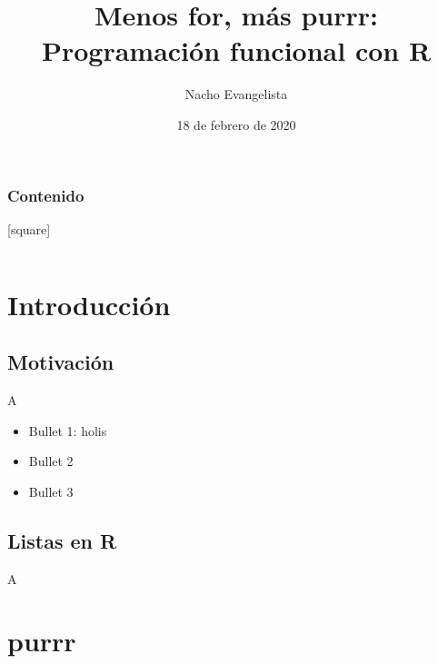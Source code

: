 \documentclass[ignorenonframetext,]{beamer}
\title{\textbf{Menos for, más purrr}:\\
Programación funcional con R}
\author{Nacho Evangelista}
\date{18 de febrero de 2020}
\providecommand{\tightlist}{%
	\setlength{\itemsep}{0pt}\setlength{\parskip}{0pt}}
\begin{document}
		\frame{\titlepage}
		
		\begin{frame}
\frametitle{Contenido} %
[square]
\begin{columns}[t]
		\tableofcontents[sections={1-3}]
		\tableofcontents[sections={4-8}]
\end{columns}
\end{frame}

\hypertarget{introducciuxf3n}{%
\section{Introducción}\label{introducciuxf3n}}

\hypertarget{motivaciuxf3n}{%
\subsection{Motivación}\label{motivaciuxf3n}}

\begin{frame}{A}
\protect\hypertarget{a}{}
\begin{itemize}
\tightlist
\item
  Bullet 1: holis
\item
  Bullet 2
\item
  Bullet 3
\end{itemize}
\end{frame}

\hypertarget{listas-en-r}{%
\subsection{Listas en R}\label{listas-en-r}}

\begin{frame}{A}
\protect\hypertarget{a-1}{}
\end{frame}

\hypertarget{purrr}{%
\section{purrr}\label{purrr}}
\end{document}
